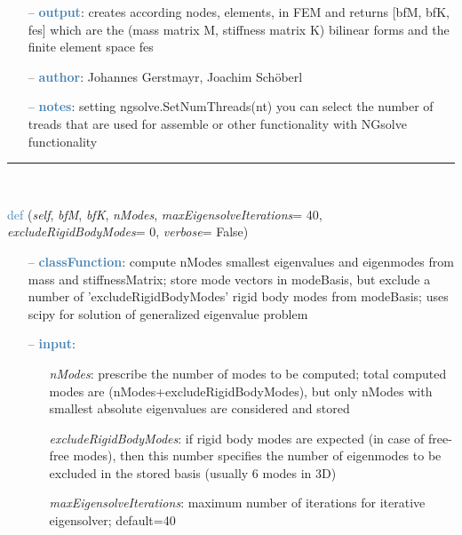 \begin{itemize}[leftmargin=1.4cm]
\begin{itemize}[leftmargin=0.5cm]
\begin{itemize}[leftmargin=1.4cm]
\begin{itemize}[leftmargin=0.5cm]
\begin{itemize}[leftmargin=0.7cm]
\begin{itemize}[leftmargin=1.2cm]
  \end{itemize}
  \item[--]  \textcolor{steelblue}{\bf output}: creates according nodes, elements, in FEM and returns [bfM, bfK, fes] which are the (mass matrix M, stiffness matrix K) bilinear forms and the finite element space fes  \item[--]  \textcolor{steelblue}{\bf author}: Johannes Gerstmayr, Joachim Sch\"oberl  \item[--]  \textcolor{steelblue}{\bf notes}: setting ngsolve.SetNumThreads(nt) you can select the number of treads that are used for assemble or other functionality with NGsolve functionality\vspace{12pt}\end{itemize}
%
\noindent\rule{8cm}{0.75pt}\vspace{1pt} \\ 
\begin{flushleft}
\noindent \textcolor{steelblue}{def {\bf {}}}\label{sec:FEM:FEMinterface:ComputeEigenmodesNGsolve}
({\it self}, {\it bfM}, {\it bfK}, {\it nModes}, {\it maxEigensolveIterations}= 40, {\it excludeRigidBodyModes}= 0, {\it verbose}= False)
\end{flushleft}
\setlength{\itemindent}{0.7cm}
\begin{itemize}[leftmargin=0.7cm]
  \item[--]  \textcolor{steelblue}{\bf classFunction}: compute nModes smallest eigenvalues and eigenmodes from mass and stiffnessMatrix; store mode vectors in modeBasis, but exclude a number of 'excludeRigidBodyModes' rigid body modes from modeBasis; uses scipy for solution of generalized eigenvalue problem  \item[--]  \textcolor{steelblue}{\bf input}: \vspace{-6pt}
  \begin{itemize}[leftmargin=1.2cm]
\setlength{\itemindent}{-0.7cm}
    \item[] {\it nModes}: prescribe the number of modes to be computed; total computed modes are  (nModes+excludeRigidBodyModes), but only nModes with smallest absolute eigenvalues are considered and stored
    \item[] {\it   excludeRigidBodyModes}: if rigid body modes are expected (in case of free-free modes), then this number specifies the number of eigenmodes to be excluded in the stored basis (usually 6 modes in 3D)
    \item[] {\it   maxEigensolveIterations}: maximum number of iterations for iterative eigensolver; default=40

\end{itemize}
\end{itemize}
\end{itemize}
\end{itemize}
\end{itemize}
\end{itemize}

